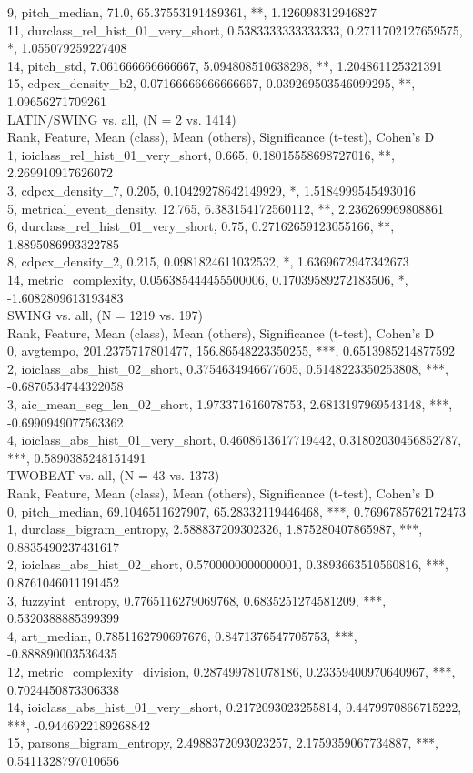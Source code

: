 9, pitch_median, 71.0, 65.37553191489361, **, 1.126098312946827\\
11, durclass_rel_hist_01_very_short, 0.5383333333333333, 0.2711702127659575, *, 1.055079259227408\\
14, pitch_std, 7.061666666666667, 5.094808510638298, **, 1.204861125321391\\
15, cdpcx_density_b2, 0.07166666666666667, 0.039269503546099295, **, 1.09656271709261\\
LATIN/SWING vs. all, (N = 2 vs. 1414)\\
Rank, Feature, Mean (class), Mean (others), Significance (t-test), Cohen's D\\
1, ioiclass_rel_hist_01_very_short, 0.665, 0.18015558698727016, **, 2.269910917626072\\
3, cdpcx_density_7, 0.205, 0.10429278642149929, *, 1.5184999545493016\\
5, metrical_event_density, 12.765, 6.383154172560112, **, 2.236269969808861\\
6, durclass_rel_hist_01_very_short, 0.75, 0.27162659123055166, **, 1.8895086993322785\\
8, cdpcx_density_2, 0.215, 0.0981824611032532, *, 1.6369672947342673\\
14, metric_complexity, 0.056385444455500006, 0.17039589272183506, *, -1.6082809613193483\\
SWING vs. all, (N = 1219 vs. 197)\\
Rank, Feature, Mean (class), Mean (others), Significance (t-test), Cohen's D\\
0, avgtempo, 201.2375717801477, 156.86548223350255, ***, 0.6513985214877592\\
2, ioiclass_abs_hist_02_short, 0.3754634946677605, 0.5148223350253808, ***, -0.6870534744322058\\
3, aic_mean_seg_len_02_short, 1.973371616078753, 2.6813197969543148, ***, -0.6990949077563362\\
4, ioiclass_abs_hist_01_very_short, 0.4608613617719442, 0.31802030456852787, ***, 0.5890385248151491\\
TWOBEAT vs. all, (N = 43 vs. 1373)\\
Rank, Feature, Mean (class), Mean (others), Significance (t-test), Cohen's D\\
0, pitch_median, 69.1046511627907, 65.28332119446468, ***, 0.7696785762172473\\
1, durclass_bigram_entropy, 2.588837209302326, 1.875280407865987, ***, 0.8835490237431617\\
2, ioiclass_abs_hist_02_short, 0.5700000000000001, 0.3893663510560816, ***, 0.8761046011191452\\
3, fuzzyint_entropy, 0.7765116279069768, 0.6835251274581209, ***, 0.5320388885399399\\
4, art_median, 0.7851162790697676, 0.8471376547705753, ***, -0.888890003536435\\
12, metric_complexity_division, 0.287499781078186, 0.23359400970640967, ***, 0.7024450873306338\\
14, ioiclass_abs_hist_01_very_short, 0.2172093023255814, 0.4479970866715222, ***, -0.9446922189268842\\
15, parsons_bigram_entropy, 2.4988372093023257, 2.1759359067734887, ***, 0.5411328797010656\\
